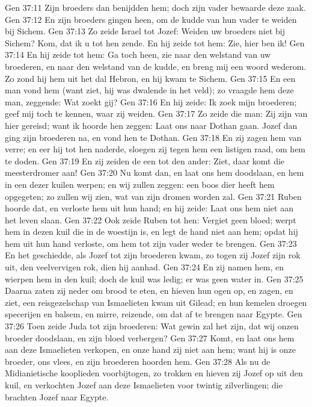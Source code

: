 Gen 37:11  Zijn broeders dan benijdden hem; doch zijn vader bewaarde deze zaak.
Gen 37:12  En zijn broeders gingen heen, om de kudde van hun vader te weiden bij Sichem.
Gen 37:13  Zo zeide Israel tot Jozef: Weiden uw broeders niet bij Sichem? Kom, dat ik u tot hen zende. En hij zeide tot hem: Zie, hier ben ik!
Gen 37:14  En hij zeide tot hem: Ga toch heen, zie naar den welstand van uw broederen, en naar den welstand van de kudde, en breng mij een woord wederom. Zo zond hij hem uit het dal Hebron, en hij kwam te Sichem.
Gen 37:15  En een man vond hem (want ziet, hij was dwalende in het veld); zo vraagde hem deze man, zeggende: Wat zoekt gij?
Gen 37:16  En hij zeide: Ik zoek mijn broederen; geef mij toch te kennen, waar zij weiden.
Gen 37:17  Zo zeide die man: Zij zijn van hier gereisd; want ik hoorde hen zeggen: Laat ons naar Dothan gaan. Jozef dan ging zijn broederen na, en vond hen te Dothan.
Gen 37:18  En zij zagen hem van verre; en eer hij tot hen naderde, sloegen zij tegen hem een listigen raad, om hem te doden.
Gen 37:19  En zij zeiden de een tot den ander: Ziet, daar komt die meesterdromer aan!
Gen 37:20  Nu komt dan, en laat ons hem doodslaan, en hem in een dezer kuilen werpen; en wij zullen zeggen: een boos dier heeft hem opgegeten; zo zullen wij zien, wat van zijn dromen worden zal.
Gen 37:21  Ruben hoorde dat, en verloste hem uit hun hand; en hij zeide: Laat ons hem niet aan het leven slaan.
Gen 37:22  Ook zeide Ruben tot hen: Vergiet geen bloed; werpt hem in dezen kuil die in de woestijn is, en legt de hand niet aan hem; opdat hij hem uit hun hand verloste, om hem tot zijn vader weder te brengen.
Gen 37:23  En het geschiedde, als Jozef tot zijn broederen kwam, zo togen zij Jozef zijn rok uit, den veelvervigen rok, dien hij aanhad.
Gen 37:24  En zij namen hem, en wierpen hem in den kuil; doch de kuil was ledig; er was geen water in.
Gen 37:25  Daarna zaten zij neder om brood te eten, en hieven hun ogen op, en zagen, en ziet, een reisgezelschap van Ismaelieten kwam uit Gilead; en hun kemelen droegen specerijen en balsem, en mirre, reizende, om dat af te brengen naar Egypte.
Gen 37:26  Toen zeide Juda tot zijn broederen: Wat gewin zal het zijn, dat wij onzen broeder doodslaan, en zijn bloed verbergen?
Gen 37:27  Komt, en laat ons hem aan deze Ismaelieten verkopen, en onze hand zij niet aan hem; want hij is onze broeder, ons vlees, en zijn broederen hoorden hem.
Gen 37:28  Als nu de Midianietische kooplieden voorbijtogen, zo trokken en hieven zij Jozef op uit den kuil, en verkochten Jozef aan deze Ismaelieten voor twintig zilverlingen; die brachten Jozef naar Egypte.
